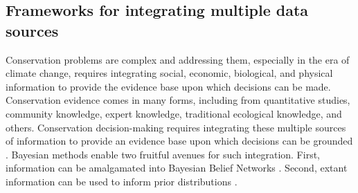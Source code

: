 \documentclass{article}
\begin{document}
\subsection*{Frameworks for integrating multiple data sources}
\par Conservation problems are complex and addressing them, especially in the era of climate change, requires integrating social, economic, biological, and physical information to provide the evidence base upon which decisions can be made. Conservation evidence comes in many forms, including from quantitative studies, community knowledge, expert knowledge, traditional ecological knowledge, and others. Conservation decision-making requires integrating these multiple sources of information to provide an evidence base upon which decisions can be grounded \citep{stern2022interweaving}. Bayesian methods enable two fruitful avenues for such integration. First, information can be amalgamated into Bayesian Belief Networks \citep{marcot2001using,newton2007bayesian}. Second, extant information can be used to inform prior distributions \citep{o2008informed}. %
\end{document}

